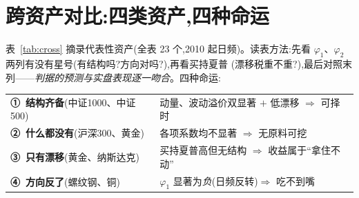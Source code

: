 \documentclass[11pt,a4paper,fontset=mac]{ctexart}
\begin{document}
\section{跨资产对比:四类资产,四种命运}
表~\ref{tab:cross} 摘录代表性资产(全表 23 个,2010 起日频)。读表方法:先看
$\varphi_1$、$\varphi_2$ 两列有没有星号(有结构吗?方向对吗?),再看买持夏普
(漂移税重不重?),最后对照末列——\emph{判据的预测与实盘表现逐一吻合}。四种命运:
\begin{center}\small
\begin{tabular}{ll}
\textbf{①~结构齐备}(中证1000、中证500) & 动量、波动溢价双显著 $+$ 低漂移 $\Rightarrow$ 可择时 \\
\textbf{②~什么都没有}(沪深300、黄金) & 各项系数均不显著 $\Rightarrow$ 无原料可挖 \\
\textbf{③~只有漂移}(黄金、纳斯达克) & 买持夏普高但无结构 $\Rightarrow$ 收益属于``拿住不动'' \\
\textbf{④~方向反了}(螺纹钢、铜) & $\varphi_1$ 显著为\emph{负}(日频反转)$\Rightarrow$ 吃不到嘴 \\
\end{tabular}
\end{center}
\end{document}
